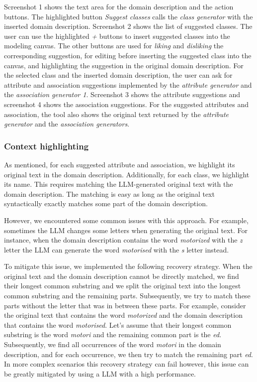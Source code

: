 Screenshot 1 shows the text area for the domain description and the action buttons. The highlighted button \textit{Suggest classes} calls the \emph{class generator} with the inserted domain description. Screenshot 2 shows the list of suggested classes. The user can use the highlighted \textit{+} buttons to insert suggested classes into the modeling canvas. The other buttons are used for \textit{liking} and \textit{disliking} the corresponding suggestion, for editing before inserting the suggested class into the canvas, and highlighting the suggestion in the original domain description. For the selected class and the inserted domain description, the user can ask for attribute and association suggestions implemented by the \emph{attribute generator} and the \emph{association generator 1}. Screenshot 3 shows the attribute suggestions and screenshot 4 shows the association suggestions. For the suggested attributes and association, the tool also shows the original text returned by the \emph{attribute generator} and the \emph{association generators}.


\subsubsection{Context highlighting}
\label{sec:context_highlighting}

As mentioned, for each suggested attribute and association, we highlight its original text in the domain description. Additionally, for each class, we highlight its name. This requires matching the LLM-generated original text with the domain description. The matching is easy as long as the original text syntactically exactly matches some part of the domain description.

However, we encountered some common issues with this approach. For example, sometimes the LLM changes some letters when generating the original text. For instance, when the domain description contains the word \textit{motorized} with the \textit{z} letter the LLM can generate the word \textit{motorised} with the \textit{s} letter instead.

To mitigate this issue, we implemented the following recovery strategy. When the original text and the domain description cannot be directly matched, we find their longest common substring and we split the original text into the longest common substring and the remaining parts. Subsequently, we try to match these parts without the letter that was in between these parts. For example, consider the original text that contains the word \textit{motorized} and the domain description that contains the word \textit{motorised}. Let's assume that their longest common substring is the word \textit{motori} and the remaining common part is the {\textit{ed}}. Subsequently, we find all occurrences of the word \textit{motori} in the domain description, and for each occurrence, we then try to match the remaining part \textit{ed}. In more complex scenarios this recovery strategy can fail however, this issue can be greatly mitigated by using a LLM with a high performance.


